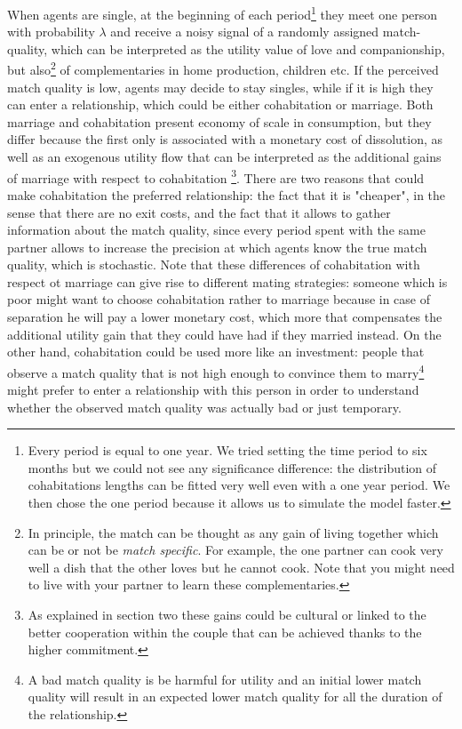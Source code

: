 \documentclass[12pt]{article}
\begin{document}
  When agents are single, at the beginning of each period\footnote{Every period is equal to one year. We tried setting the time period to six months but we could not see any significance difference: the distribution of cohabitations lengths can be fitted very well even with a one year period. We then chose the one period because it allows us to simulate the model faster.} they meet one person with probability $\lambda$ and receive a noisy signal of a randomly assigned match-quality, which can be interpreted as the utility value of love and companionship, but also\footnote{In principle, the match can be thought as any gain of living together which can be or not be \textit{match specific}. For example, the one partner can cook very well a dish that the other loves but he cannot cook. Note that you might need to live with your partner to learn these complementaries.} of complementaries in home production, children etc. If the perceived match quality is low, agents may decide to stay singles, while if it is high they can enter a relationship, which could be either cohabitation or marriage. Both marriage and cohabitation present economy of scale in consumption, but they differ because the first only is associated with a monetary cost of dissolution, as well as an exogenous utility flow that can be interpreted as the additional gains of marriage with respect to cohabitation \footnote{As explained in section two these gains could be cultural or linked to the better cooperation within the couple that can be achieved thanks to the higher commitment.}. There are two reasons that could make cohabitation the preferred relationship: the fact that it is "cheaper", in the sense that there are no exit costs, and the fact that it allows to gather information about the match quality, since every period spent with the same partner allows to increase the precision at which agents know the true match quality, which is stochastic. Note that these differences of cohabitation with respect ot marriage can give rise to different mating strategies: someone which is poor might want to choose cohabitation rather to marriage because in case of separation he will pay a lower monetary cost, which more that compensates the additional utility gain that they could have had if they married instead. On the other hand, cohabitation could be used more like an investment: people that observe a match quality that is not high enough to convince them to marry\footnote{A bad match quality is be harmful for utility and an initial lower match quality will result in an expected lower match quality for all the duration of the relationship.} might prefer to enter a relationship with this person in order to understand whether the observed match quality was actually bad or just temporary.
\end{document}
